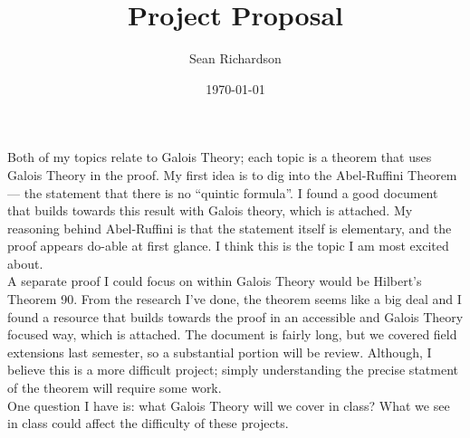 \documentclass[12]{amsart}
\begin{document}
\title{Project Proposal}
\author{Sean Richardson}
\date{\today}
\maketitle

    Both of my topics relate to Galois Theory; each topic is a theorem that
    uses Galois Theory in the proof. My first idea is to dig into the
    Abel-Ruffini Theorem --- the statement that there is no ``quintic
    formula''. I found a good document that builds towards this result with
    Galois theory, which is attached.  My reasoning behind Abel-Ruffini is that
    the statement itself is elementary, and the proof appears do-able at first
    glance. I think this is the topic I am most excited about. \\

    A separate proof I could focus on within Galois Theory would be Hilbert's
    Theorem 90. From the research I've done, the theorem seems like a big deal
    and I found a resource that builds towards the proof in an accessible and
    Galois Theory focused way, which is attached. The document is fairly long,
    but we covered field extensions last semester, so a substantial portion
    will be review. Although, I believe this is a more difficult project;
    simply understanding the precise statment of the theorem will require some
    work. \\

    One question I have is: what Galois Theory will we cover in class? What we
    see in class could affect the difficulty of these projects.
\end{document}
